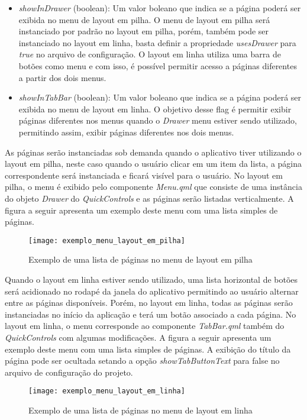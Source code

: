 \begin{itemize}
	\item \textit{showInDrawer} (boolean): Um valor boleano que indica se a página poderá ser exibida no menu de layout em pilha. O menu de layout em pilha será instanciado por padrão no layout em pilha, porém, também pode ser instanciado no layout em linha, basta definir a propriedade \textit{usesDrawer} para \textit{true} no arquivo de configuração. O layout em linha utiliza uma barra de botões como menu e com isso, é possível permitir acesso a páginas diferentes a partir dos dois menus.

	\item \textit{showInTabBar} (boolean): Um valor boleano que indica se a página poderá ser exibida no menu de layout em linha. O objetivo desse flag é permitir exibir páginas diferentes nos menus quando o \textit{Drawer} menu estiver sendo utilizado, permitindo assim, exibir páginas diferentes nos dois menus.
\end{itemize}

As páginas serão instanciadas sob demanda quando o aplicativo tiver utilizando o layout em pilha, neste caso quando o usuário clicar em um item da lista, a página correspondente será instanciada e ficará visível para o usuário. No layout em pilha, o menu é exibido pelo componente \textit{Menu.qml} que consiste de uma instância do objeto \textit{Drawer} do \textit{QuickControls} e as páginas serão listadas verticalmente. A figura a seguir apresenta um exemplo deste menu com uma lista simples de páginas.

\begin{figure}[H]
	\texttt{[image: exemplo\_menu\_layout\_em\_pilha]}
	\centering
	\caption{Exemplo de uma lista de páginas no menu de layout em pilha}
\end{figure}

Quando o layout em linha estiver sendo utilizado, uma lista horizontal de botões será acidionado no rodapé da janela do aplicativo permitindo ao usuário alternar entre as páginas disponíveis. Porém, no layout em linha, todas as páginas serão instanciadas no início da aplicação e terá um botão associado a cada página. No layout em linha, o menu corresponde ao componente \textit{TabBar.qml} também do \textit{QuickControls} com algumas modificações. A figura a seguir apresenta um exemplo deste menu com uma lista simples de páginas. A exibição do título da página pode ser ocultada setando a opção \textit{showTabButtonText} para false no arquivo de configuração do projeto.

\begin{figure}[H]
	\texttt{[image: exemplo\_menu\_layout\_em\_linha]}
	\centering
	\caption{Exemplo de uma lista de páginas no menu de layout em linha}
\end{figure}


